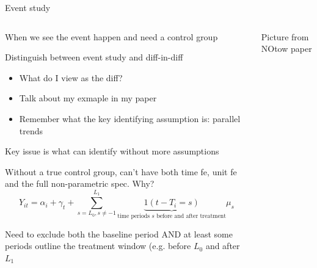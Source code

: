 \documentclass[notes,11pt, aspectratio=169]{beamer}
\newenvironment{wideitemize}{\itemize\addtolength{\itemsep}{10pt}}{\enditemize}
\begin{document}
\begin{frame}{Event study}
  \begin{columns}[T] %
    \begin{column}{0.7\textwidth}
      \begin{wideitemize}
      \item When we see the event happen and need a control group
      \item Distinguish between event study and diff-in-diff
        \begin{itemize}
        \item What do I view as the diff?
        \item Talk about my exmaple in my paper
        \item Remember what the key identifying assumption is: parallel trends
        \end{itemize}
      \item Key issue is what can identify without more assumptions
      \item Without a true control group, can't have both time fe,   unit fe and the full non-parametric spec. Why?
        \begin{equation}
          Y_{it} = \alpha_{i} + \gamma_{t} + \sum_{s = L_{0}, s\not=-1}^{L_{1}}\underbrace{1(t-T_{i} = s)}_{\text{time periods $s$ before and after treatment}}\mu_{s}
          \end{equation}
        \item Need to exclude both the baseline period AND at least some periods outline the treatment window (e.g. before $L_{0}$ and after $L_{1}$
        \end{wideitemize}
      \end{column}%
      \hfill%
      \begin{column}{.3\textwidth}
        Picture from NOtow paper
      \end{column}%
    \end{columns}
  \end{frame}
\end{document}

